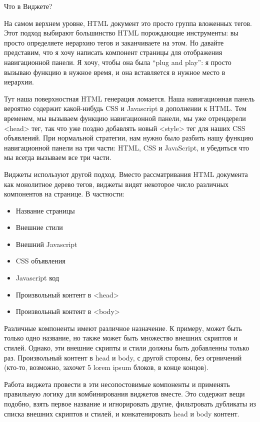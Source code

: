 Что в Виджете?

На самом верхнем уровне, HTML документ это просто группа вложенных тегов. Этот подход выбирают большинство HTML порождающие инструменты: вы просто определяете иерархию тегов и заканчиваете на этом. Но давайте представим, что я хочу написать компонент страницы для отображения навигационной панели. Я хочу, чтобы она была \textquotedblleft plug and play\textquotedblright : я просто вызываю функцию в нужное время, и она вставляется в нужное место в иерархии.

Тут наша поверхностная HTML генерация ломается. Наша навигационная панель вероятно содержит какой-нибудь CSS и Javascript в дополнении к HTML. Тем временем, мы вызываем функцию навигационной панели, мы уже отрендерели <head> тег, так что уже поздно добавлять новый <style> тег для наших CSS объявлений. При нормальной стратегии, нам нужно было разбить нашу функцию навигационной панели на три части: HTML, CSS и JavaScript, и убедиться что мы всегда вызываем все три части.  

Виджеты используют другой подход. Вместо рассматривания HTML документа как монолитное дерево тегов, виджеты видят некоторое число различных компонентов на странице. В частности:

\begin{itemize}
  \item Название страницы
  \item Внешние стили
  \item Внешний Javascript
  \item CSS объявления
  \item Javascript код
  \item Произвольный контент в <head> 
  \item Произвольный контент в <body>
\end{itemize}

Различные компоненты имеют различное назначение. К примеру, может быть только одно название, но также может быть множество внешних скриптов и стилей. Однако, эти внешние скрипты и стили должны быть добавленны только раз. Произвольный контент в head и body, с другой стороны, без огрничений (кто-то, возможно, захочет 5 lorem ipsum блоков, в конце концов).

Работа виджета провести в эти несопостовимые компоненты и применять правильную логику для комбинирования виджетов вместе. Это содержит вещи подобно, взять первое название и игнорировать другие, фильтровать дубликаты из списка внешних скриптов и стилей, и конкатенировать head и body контент. %


